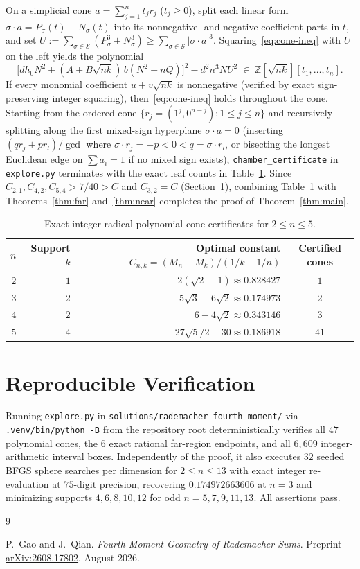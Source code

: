 \documentclass[11pt]{article}
\theoremstyle{plain}
\theoremstyle{definition}
\theoremstyle{remark}
\begin{document}
On a simplicial cone $a = \sum_{j=1}^n t_j r_j$ ($t_j \ge 0$), split each linear form $\sigma \cdot a = P_\sigma(t) - N_\sigma(t)$ into its nonnegative- and negative-coefficient parts in $t$, and set $U := \sum_{\sigma \in \mathcal{S}} (P_\sigma^3 + N_\sigma^3) \ge \sum_{\sigma \in \mathcal{S}} |\sigma \cdot a|^3$.
Squaring~\eqref{eq:cone-ineq} with $U$ on the left yields the polynomial
\[
\bigl[d h_0 N^2 + (A + B\sqrt{nk})\,b(N^2 - nQ)\bigr]^2 - d^2 n^3 N U^2 \;\in\; \mathbb{Z}[\sqrt{nk}][t_1, \dots, t_n].
\]
If every monomial coefficient $u + v\sqrt{nk}$ is nonnegative (verified by exact sign-preserving integer squaring), then~\eqref{eq:cone-ineq} holds throughout the cone.
Starting from the ordered cone $\{r_j = (1^j, 0^{n-j}) : 1 \le j \le n\}$ and recursively splitting along the first mixed-sign hyperplane $\sigma \cdot a = 0$ (inserting $(q r_j + p r_l)/\gcd$ where $\sigma \cdot r_j = -p < 0 < q = \sigma \cdot r_l$, or bisecting the longest Euclidean edge on $\sum a_i = 1$ if no mixed sign exists), \texttt{chamber\_certificate} in \texttt{explore.py} terminates with the exact leaf counts in Table~\ref{tab:cones}.
Since $C_{2,1}, C_{4,2}, C_{5,4} > 7/40 > C$ and $C_{3,2} = C$ (Section~1), combining Table~\ref{tab:cones} with Theorems~\ref{thm:far} and~\ref{thm:near} completes the proof of Theorem~\ref{thm:main}.

\begin{table}[ht]
\centering
\begin{tabular}{@{}rrrc@{}}
\toprule
$n$ & Support $k$ & Optimal constant $C_{n,k} = (M_n - M_k)/(1/k - 1/n)$ & Certified cones \\
\midrule
$2$ & $1$ & $2(\sqrt{2} - 1) \approx 0.828427$ & $1$ \\
$3$ & $2$ & $5\sqrt{3} - 6\sqrt{2} \approx 0.174973$ & $2$ \\
$4$ & $2$ & $6 - 4\sqrt{2} \approx 0.343146$ & $3$ \\
$5$ & $4$ & $27\sqrt{5}/2 - 30 \approx 0.186918$ & $41$ \\
\bottomrule
\end{tabular}
\caption{Exact integer-radical polynomial cone certificates for $2 \le n \le 5$.}\label{tab:cones}
\end{table}

\section{Reproducible Verification}

Running \texttt{explore.py} in \texttt{solutions/rademacher\_fourth\_moment/} via \texttt{.venv/bin/python -B} from the repository root deterministically verifies all $47$ polynomial cones, the $6$ exact rational far-region endpoints, and all $6{,}609$ integer-arithmetic interval boxes.
Independently of the proof, it also executes $32$ seeded BFGS sphere searches per dimension for $2 \le n \le 13$ with exact integer re-evaluation at $75$-digit precision, recovering $0.174972663606$ at $n = 3$ and minimizing supports $4, 6, 8, 10, 12$ for odd $n = 5, 7, 9, 11, 13$. All assertions pass.

\begin{thebibliography}{9}

P.~Gao and J.~Qian.
\emph{Fourth-Moment Geometry of Rademacher Sums}.
Preprint \href{https://arxiv.org/abs/2608.17802}{arXiv:2608.17802}, August 2026.

\end{thebibliography}
\end{document}
